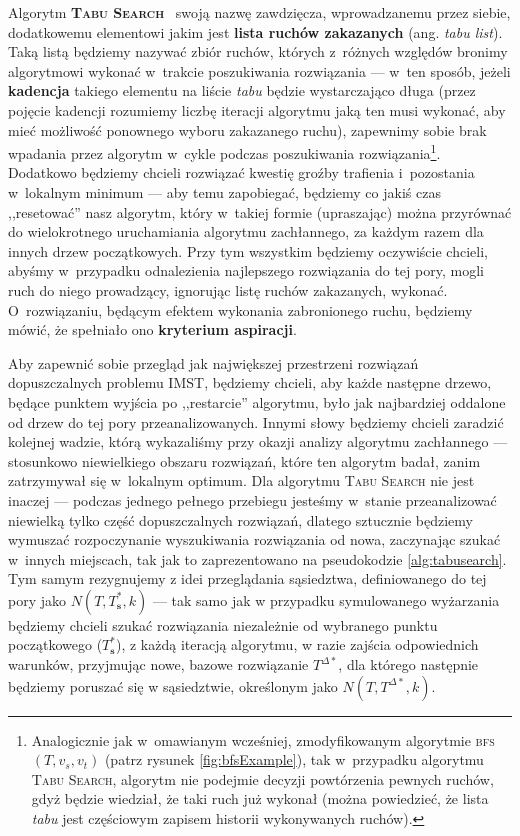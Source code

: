 Algorytm \textsc{\textbf{Tabu Search}}~\cite{TabuSearch} swoją nazwę zawdzięcza, wprowadzanemu przez siebie, dodatkowemu elementowi jakim jest \textbf{lista ruchów zakazanych} (ang. \textit{tabu list}). Taką listą będziemy nazywać zbiór ruchów, których z~różnych względów bronimy algorytmowi wykonać w~trakcie poszukiwania rozwiązania --- w~ten sposób, jeżeli \textbf{kadencja} takiego elementu na liście \textit{tabu} będzie wystarczająco długa (przez pojęcie kadencji rozumiemy liczbę iteracji algorytmu jaką ten musi wykonać, aby mieć możliwość ponownego wyboru zakazanego ruchu), zapewnimy sobie brak wpadania przez algorytm w~cykle podczas poszukiwania rozwiązania\footnote{Analogicznie jak w~omawianym wcześniej, zmodyfikowanym algorytmie \textsc{bfs} $\left( T, v_{s}, v_{t} \right)$ (patrz rysunek \ref{fig:bfsExample}), tak w~przypadku algorytmu \textsc{Tabu Search}, algorytm nie podejmie decyzji powtórzenia pewnych ruchów, gdyż będzie wiedział, że taki ruch już wykonał (można powiedzieć, że lista \textit{tabu} jest częściowym zapisem historii wykonywanych ruchów).}. Dodatkowo będziemy chcieli rozwiązać kwestię groźby trafienia i~pozostania w~lokalnym minimum --- aby temu zapobiegać, będziemy co jakiś czas ,,resetować'' nasz algorytm, który w~takiej formie (upraszając) można przyrównać do wielokrotnego uruchamiania algorytmu zachłannego, za każdym razem dla innych drzew początkowych. Przy tym wszystkim będziemy oczywiście chcieli, abyśmy w~przypadku odnalezienia najlepszego rozwiązania do tej pory, mogli ruch do niego prowadzący, ignorując listę ruchów zakazanych, wykonać. O~rozwiązaniu, będącym efektem wykonania zabronionego ruchu, będziemy mówić, że spełniało ono \textbf{kryterium aspiracji}.

Aby zapewnić sobie przegląd jak największej przestrzeni rozwiązań dopuszczalnych problemu \textsc{IMST}, będziemy chcieli, aby każde następne drzewo, będące punktem wyjścia po ,,restarcie'' algorytmu, było jak najbardziej oddalone od drzew do tej pory przeanalizowanych. Innymi słowy będziemy chcieli zaradzić kolejnej wadzie, którą wykazaliśmy przy okazji analizy algorytmu zachłannego --- stosunkowo niewielkiego obszaru rozwiązań, które ten algorytm badał, zanim zatrzymywał się w~lokalnym optimum. Dla algorytmu \textsc{Tabu Search} nie jest inaczej --- podczas jednego pełnego przebiegu jesteśmy w~stanie przeanalizować niewielką tylko część dopuszczalnych rozwiązań, dlatego sztucznie będziemy wymuszać rozpoczynanie wyszukiwania rozwiązania od nowa, zaczynając szukać w~innych miejscach, tak jak to zaprezentowano na pseudokodzie \ref{alg:tabusearch}. Tym samym rezygnujemy z idei przeglądania sąsiedztwa, definiowanego do tej pory jako $N \left( T, T^{\ast}_{\textbf{s}}, k \right)$ --- tak samo jak w przypadku symulowanego wyżarzania będziemy chcieli szukać rozwiązania niezależnie od wybranego punktu początkowego ($T^{\ast}_{\textbf{s}}$), z każdą iteracją algorytmu, w razie zajścia odpowiednich warunków, przyjmując nowe, bazowe rozwiązanie $T^{\Delta\ast}$, dla którego następnie będziemy poruszać się w sąsiedztwie, określonym jako $N \left( T, T^{\Delta\ast}, k \right)$.

